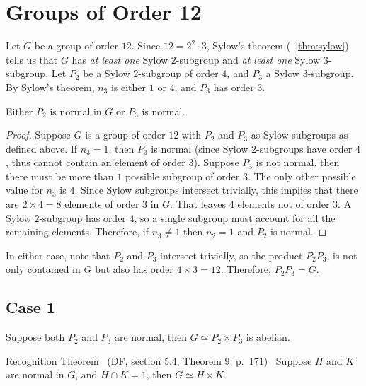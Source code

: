 
\section{Groups of Order 12}

Let $G$ be a group of order $12$.
Since $12 = 2^2 \cdot 3$, Sylow's theorem (~\ref{thm:sylow})
tells us that $G$ has \emph{at least one} Sylow $2$-subgroup
and \emph{at least one} Sylow $3$-subgroup.
Let $P_2$ be a Sylow $2$-subgroup of order $4$, and $P_3$ a Sylow $3$-subgroup.
By Sylow's theorem, $n_3$ is either $1$ or $4$, and $P_3$ has order $3$.

\begin{proposition}
  Either $P_2$ is normal in $G$ or $P_3$ is normal.

  \begin{proof}
    Suppose $G$ is a group of order $12$ with $P_2$ and $P_3$
    as Sylow subgroups as defined above.
    If $n_3 = 1$, then $P_3$ is normal (since Sylow $2$-subgroups
    have order $4$, thus cannot contain an element of order $3$).
    Suppose $P_3$ is not normal, then there must be more than
    $1$ possible subgroup of order $3$.
    The only other possible value for $n_3$ is $4$.
    Since Sylow subgroups intersect trivially,
    this implies that there are $2 \times 4 = 8$ elements of order $3$ in $G$.
    That leaves $4$ elements not of order $3$.
    A Sylow $2$-subgroup has order $4$, so a single subgroup
    must account for all the remaining elements. Therefore,
    if $n_3 \neq 1$ then $n_2 = 1$ and $P_2$ is normal.
  \end{proof}

  In either case, note that $P_2$ and $P_3$ intersect trivially,
  so the product $P_2P_3$, is not only contained in $G$
  but also has order $4 \times 3 = 12$.
  Therefore, $P_2P_3 = G$.
\end{proposition}

\subsection*{Case 1} Suppose both $P_2$ and $P_3$ are normal,
then $G \simeq P_2 \times P_3$ is abelian.

\begin{theorem}{Recognition Theorem}~\label{thm:recognition~theorem}
  (DF, section 5.4, Theorem 9, p.~171)~\cite{DummitFoote}
  Suppose $H$ and $K$ are normal in $G$, and $H \cap K = 1$,
  then $G \simeq H \times K$.
\end{theorem}

